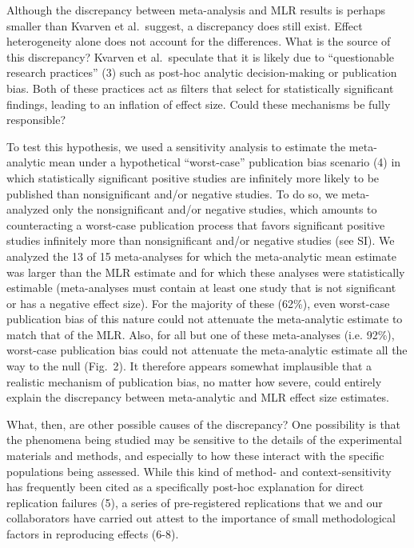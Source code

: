 \documentclass[12pt]{article}
\begin{document}
Although the discrepancy between meta-analysis and MLR results is perhaps smaller than Kvarven et al.\ suggest, a discrepancy does still exist. Effect heterogeneity alone does not account for the differences. What is the source of this discrepancy? Kvarven et al.\ speculate that it is likely due to “questionable research practices” (3) such as post-hoc analytic decision-making or publication bias. Both of these practices act as filters that select for statistically significant findings, leading to an inflation of effect size. Could these mechanisms be fully responsible? 

To test this hypothesis, we used a sensitivity analysis to estimate the meta-analytic mean under a hypothetical “worst-case” publication bias scenario (4) in which statistically significant positive studies are infinitely more likely to be published than nonsignificant and/or negative studies. To do so, we meta-analyzed  only the nonsignificant and/or negative studies, which amounts to counteracting a worst-case publication process that favors significant positive studies infinitely more than nonsignificant and/or negative studies (see SI). We analyzed the 13 of 15 meta-analyses for which the meta-analytic mean estimate was larger than the MLR estimate and for which these analyses were statistically estimable (meta-analyses must contain at least one study that is not significant or has a negative effect size). For the majority of these (62\%), even worst-case publication bias of this nature could not attenuate the meta-analytic estimate to match that of the MLR. Also, for all but one of these meta-analyses (i.e. 92\%), worst-case publication bias could not attenuate the meta-analytic estimate all the way to the null (Fig.\ 2). It therefore appears somewhat implausible that a realistic mechanism of publication bias, no matter how severe, could entirely explain the discrepancy between meta-analytic and MLR effect size estimates.

What, then, are other possible causes of the discrepancy? One possibility is that the phenomena being studied may be sensitive to the details of the experimental materials and methods, and especially to how these interact with the specific populations being assessed. While this kind of method- and context-sensitivity has frequently been cited as a specifically post-hoc explanation for direct replication failures (5), a series of pre-registered replications that we and our collaborators have carried out attest to the importance of small methodological factors in reproducing effects (6-8). 
\end{document}
